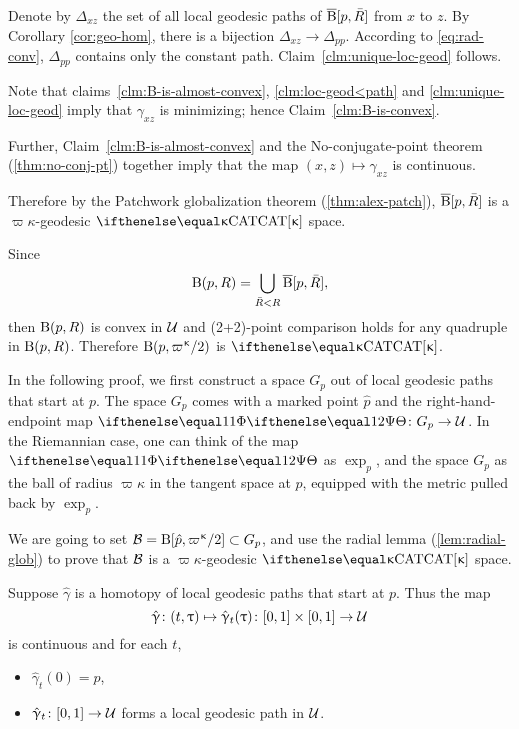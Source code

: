 Denote by $\Delta_{x z}$ the set of all local geodesic paths of $\overline{\mathrm{B}}{}[ p,\bar R]$ from $x$ to $z$.
By Corollary \ref{cor:geo-hom}, there is a  bijection $\Delta_{x z}\to\Delta_{ p p}$.
According to \ref{eq:rad-conv}, 
$\Delta_{ p p}$ contains only the constant path. Claim~\ref{clm:unique-loc-geod} follows.


Note that 
claims~\ref{clm:B-is-almost-convex}, 
\ref{clm:loc-geod<path} 
and \ref{clm:unique-loc-geod}
imply that $\gamma_{x z}$ is minimizing; hence Claim~\ref{clm:B-is-convex}.

Further, Claim~\ref{clm:B-is-almost-convex} and the No-conjugate-point theorem (\ref{thm:no-conj-pt}) together 
imply that the map $(x,z)\mapsto\gamma_{x z}$ is continuous.

Therefore by the Patchwork globalization theorem (\ref{thm:alex-patch}), 
$\overline{\mathrm{B}}{}[ p,\bar R]$ is a $\varpi\kappa$-geodesic $\CAT\kappa$ space.

Since
\[\mathrm{B}{}( p,R)
=
\bigcup_{\bar R < R}\overline{\mathrm{B}}{}[ p,\bar R],\] 
then $\mathrm{B}{}( p,R)$ is convex in $\mathcal{U}$ and 
(2+2)-point comparison holds  for any quadruple in $\mathrm{B}{}( p,R)$.
Therefore $\oBall( p,\varpi\kappa/2)$ is $\CAT\kappa$.
\qeds


In the following proof, we first construct a space $G_p$
out of  local geodesic paths that start at $p$. The space   $G_p$
 comes with 
a marked point $\hat p$ 
and the right-hand-endpoint map $\map\:G_p\to\spc{U}$.
In the Riemannian case, one can think of
the map $\map$  as $\exp_p$, and
the space $G_p$ as the ball of radius $\varpi\kappa$ in the tangent space at $p$, equipped with the metric pulled back by $\exp_p$.

We are going to set $\spc{B}=\oBall[\hat p,\varpi\kappa/2]\subset G_p$,
and use the radial lemma (\ref{lem:radial-glob}) to prove that $\mathcal{B}$ is a $\varpi\kappa$-geodesic $\CAT\kappa$ space.

Suppose $\hat\gamma$ is a homotopy of local geodesic paths that start at $p$.  Thus the map 
\[\hat\gamma\:(t,\tau)\mapsto\hat\gamma_t(\tau)\:[0,1]\times[0,1]\to\spc{U}\] 
is continuous
and for each $t$,
\begin{itemize}
\item $\hat\gamma_t(0)=p$,
\item $\hat\gamma_t\:[0,1]\to\spc{U}$ forms a local geodesic path in $\mathcal{U}$.
\end{itemize}

